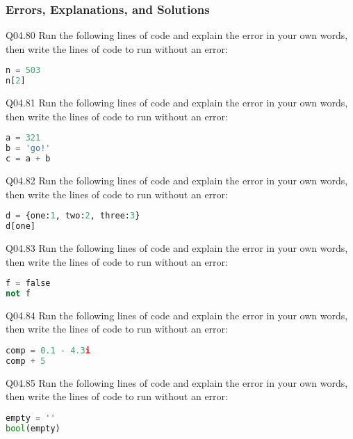 \documentclass{book}
\newenvironment{problems}{}{}  %
\begin{document}
    
        \begin{problems}
        \hypertarget{errors-explanations-and-solutions}{%
\subsubsection{Errors, Explanations, and
Solutions}\label{errors-explanations-and-solutions}}

Q04.80 Run the following lines of code and explain the error in your own
words, then write the lines of code to run without an error:

\begin{lstlisting}[language=Python]
n = 503
n[2]
\end{lstlisting}

Q04.81 Run the following lines of code and explain the error in your own
words, then write the lines of code to run without an error:

\begin{lstlisting}[language=Python]
a = 321
b = 'go!'
c = a + b
\end{lstlisting}

Q04.82 Run the following lines of code and explain the error in your own
words, then write the lines of code to run without an error:

\begin{lstlisting}[language=Python]
d = {one:1, two:2, three:3}
d[one]
\end{lstlisting}

Q04.83 Run the following lines of code and explain the error in your own
words, then write the lines of code to run without an error:

\begin{lstlisting}[language=Python]
f = false
not f
\end{lstlisting}

Q04.84 Run the following lines of code and explain the error in your own
words, then write the lines of code to run without an error:

\begin{lstlisting}[language=Python]
comp = 0.1 - 4.3i
comp + 5
\end{lstlisting}

Q04.85 Run the following lines of code and explain the error in your own
words, then write the lines of code to run without an error:

\begin{lstlisting}[language=Python]
empty = ''
bool(empty)
\end{lstlisting}


\end{problems}
\end{document}
